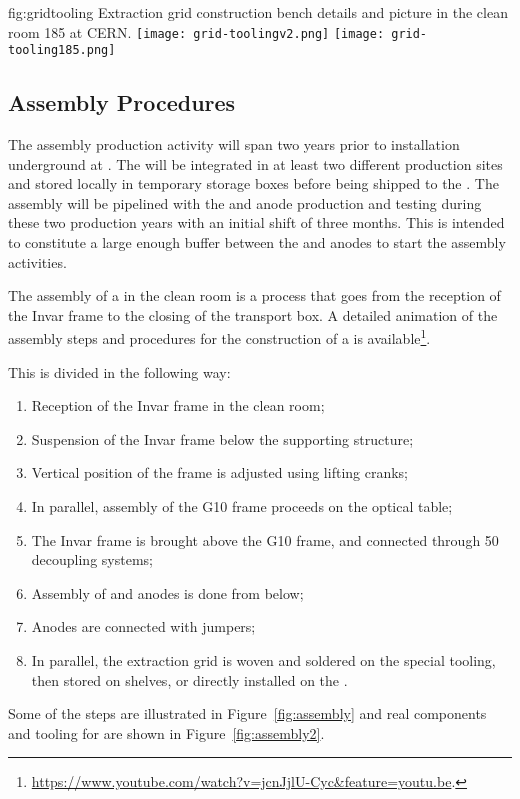 \begin{dunefigure}{fig:gridtooling}
{Extraction grid construction bench details and picture in the clean room 185 at CERN.}
\texttt{[image: grid-toolingv2.png]}
\texttt{[image: grid-tooling185.png]}
\end{dunefigure}

\subsection{Assembly Procedures}
\label{sec:fddp-crp-assy}

The  assembly production activity will span two years 
prior to  installation underground at \surf. The  will be integrated in at least two different production sites and stored locally in temporary storage boxes before being shipped to the . %
The  assembly will be pipelined with the  and anode production and testing during these two production years with an initial  shift of three months. This is intended to constitute a large enough buffer between the  and anodes to start the  assembly activities.

The assembly of a  in the clean room is a process that goes from the reception of the Invar frame to the  closing of the transport box. 
A detailed animation of the assembly steps and procedures for the construction of a   is available\footnote{\url{https://www.youtube.com/watch?v=jcnJjlU-Cyc&feature=youtu.be}.}.

This is divided in the following way:
\begin{enumerate}
\item Reception of the Invar frame in the clean room;
\item  Suspension of the Invar frame below the supporting structure;
\item  Vertical position of the frame is adjusted using lifting cranks;
\item  In parallel, assembly of the G10 frame proceeds on the optical table;
\item  The Invar frame is brought above the G10 frame, and connected through \num{50} decoupling systems;
\item  Assembly of  and anodes is done from below;
\item  Anodes are connected with jumpers;
\item  In parallel, the extraction grid is woven and soldered on the special tooling, then stored on shelves, or directly installed on the .
\end{enumerate}
Some of the steps are illustrated in Figure~\ref{fig:assembly} and real components and tooling for  are shown in Figure~\ref{fig:assembly2}.

